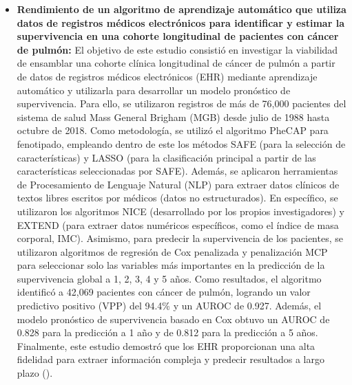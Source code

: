 \begin{itemize}
\item \textbf{Rendimiento de un algoritmo de aprendizaje automático que utiliza datos de registros médicos electrónicos para identificar y estimar la supervivencia en una cohorte longitudinal de pacientes con cáncer de pulmón:} El objetivo de este estudio consistió en investigar la viabilidad de ensamblar una cohorte clínica longitudinal de cáncer de pulmón a partir de datos de registros médicos electrónicos (EHR) mediante aprendizaje automático y utilizarla para desarrollar un modelo pronóstico de supervivencia. Para ello, se utilizaron registros de más de 76,000 pacientes del sistema de salud Mass General Brigham (MGB) desde julio de 1988 hasta octubre de 2018. Como metodología, se utilizó el algoritmo PheCAP para fenotipado, empleando dentro de este los métodos SAFE (para la selección de características) y LASSO (para la clasificación principal a partir de las características seleccionadas por SAFE). Además, se aplicaron herramientas de Procesamiento de Lenguaje Natural (NLP) para extraer datos clínicos de textos libres escritos por médicos (datos no estructurados). En específico, se utilizaron los algoritmos NICE (desarrollado por los propios investigadores) y EXTEND (para extraer datos numéricos específicos, como el índice de masa corporal, IMC). Asimismo, para predecir la supervivencia de los pacientes, se utilizaron algoritmos de regresión de Cox penalizada y penalización MCP para seleccionar solo las variables más importantes en la predicción de la supervivencia global a 1, 2, 3, 4 y 5 años. Como resultados, el algoritmo identificó a 42,069 pacientes con cáncer de pulmón, logrando un valor predictivo positivo (VPP) del 94.4\% y un AUROC de 0.927. Además, el modelo pronóstico de supervivencia basado en Cox obtuvo un AUROC de 0.828 para la predicción a 1 año y de 0.812 para la predicción a 5 años. Finalmente, este estudio demostró que los EHR proporcionan una alta fidelidad para extraer información compleja y predecir resultados a largo plazo (\cite{article9}).

\end{itemize}
